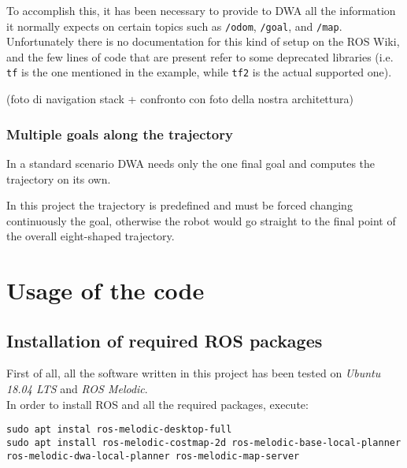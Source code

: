 \documentclass[11pt,a4paper]{article}
\begin{document}
To accomplish this, it has been necessary to provide to DWA all the information it normally expects on certain topics such as \texttt{/odom}, \texttt{/goal}, and \texttt{/map}.\\

Unfortunately there is no documentation for this kind of setup on the ROS Wiki, and the few lines of code that are present
refer to some deprecated libraries (i.e. \texttt{tf} is the one mentioned in the example, while \texttt{tf2} is the actual
supported one).

(foto di navigation stack + confronto con foto della nostra architettura)

\subsubsection{Multiple goals along the trajectory}

In a standard scenario DWA needs only the one final goal and computes the trajectory on its own.

In this project the trajectory is predefined and must be forced changing continuously the goal, otherwise the robot
would go straight to the final point of the overall eight-shaped trajectory.




\section{Usage of the code}

\subsection{Installation of required ROS packages}

First of all, all the software written in this project has been tested on \textit{Ubuntu 18.04 LTS} and \textit{ROS Melodic}.\\

In order to install ROS and all the required packages, execute:

\begin{lstlisting}
sudo apt instal ros-melodic-desktop-full
sudo apt install ros-melodic-costmap-2d ros-melodic-base-local-planner ros-melodic-dwa-local-planner ros-melodic-map-server
\end{lstlisting}
\end{document}
